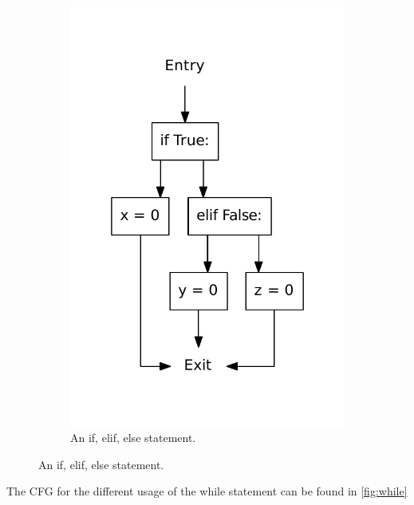 \begin{figure}
\begin{subfigure}[b]{0.3\textwidth}
    \includegraphics[width=\textwidth]{./figures/if_else_elif.pdf}
    \caption{An if, elif, else statement.}
    \label{fig:if:if_elif_else}
  \end{subfigure}
  \label{fig:if}
\end{figure}

The CFG for the different usage of the while statement can be found in \cref{fig:while}

